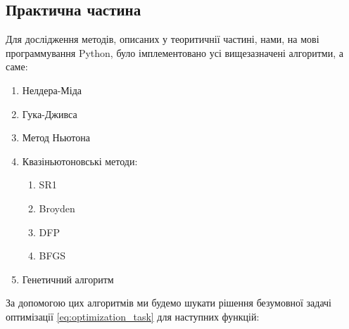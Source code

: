 \begin{center}
    \section*{Практична частина}
\end{center}

Для дослідження методів, описаних у теоритичнії
частині, нами, на мові программування Python, було імплементовано усі вищезазначені алгоритми,
а саме:
\vspace{0.25cm}
\begin{enumerate}
    \item Нелдера-Міда
    \item Гука-Дживса
    \item Метод Ньютона
    \item Квазіньютоновські методи:
    \begin{enumerate}
        \item SR1
        \item Broyden
        \item DFP
        \item BFGS
    \end{enumerate}
    \item Генетичний алгоритм
\end{enumerate}

За допомогою цих алгоритмів ми будемо шукати
рішення безумовної задачі оптимізації \ref{eq:optimization_task}
для наступних функцій:

